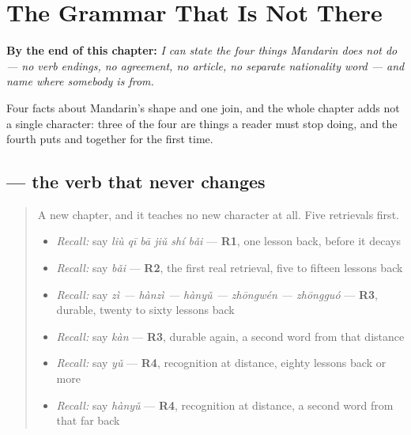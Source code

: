 
\chapter{The Grammar That Is Not There}
\label{ch:zh-no-endings}

\begin{chapteropening}
\textbf{By the end of this chapter:} \emph{I can state the four things Mandarin does not do — no verb endings, no agreement, no article, no separate nationality word — and name where somebody is from.}

Four facts about Mandarin's shape and one join, and the whole chapter adds not a single character: three of the four are things a reader must stop doing, and the fourth puts  and  together for the first time.
\end{chapteropening}

\section[\texorpdfstring{\zh{看} — \zh{看} — \zh{看} (kàn)}{看 — 看 — 看 (kàn)}]{ — the verb that never changes}

\label{lesson:ZH-C22-bubian}



\begin{quote}
A new chapter, and it teaches no new character at all. Five retrievals first.

\begin{itemize}
\raggedright
  \item \emph{Recall:} say \emph{liù qī bā jiǔ shí bǎi} — \textbf{R1}, one lesson back, before it decays
  \item \emph{Recall:} say \emph{bǎi} — \textbf{R2}, the first real retrieval, five to fifteen lessons back
  \item \emph{Recall:} say \emph{zì — hànzì — hànyǔ — zhōngwén — zhōngguó} — \textbf{R3}, durable, twenty to sixty lessons back
  \item \emph{Recall:} say \emph{kàn} — \textbf{R3}, durable again, a second word from that distance
  \item \emph{Recall:} say \emph{yǔ} — \textbf{R4}, recognition at distance, eighty lessons back or more
  \item \emph{Recall:} say \emph{hànyǔ} — \textbf{R4}, recognition at distance, a second word from that far back
\end{itemize}
\end{quote}

